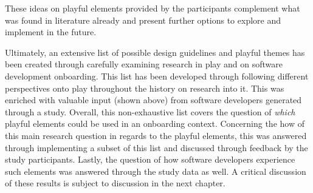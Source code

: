 These ideas on playful elements provided by the participants complement what was found in literature already and present further options to explore and implement in the future.

Ultimately, an extensive list of possible design guidelines and playful themes has been created through carefully examining research in play and on software development onboarding. This list has been developed through following different perspectives onto play throughout the history on research into it. This was enriched with valuable input (shown above) from software developers generated through a study. Overall, this non-exhaustive list covers the question of \textit{which} playful elements could be used in an onboarding context. Concerning the how of this main research question in regards to the playful elements, this was answered through implementing a subset of this list and discussed through feedback by the study participants. Lastly, the question of how software developers experience such elements was answered through the study data as well. A critical discussion of these results is subject to discussion in the next chapter.